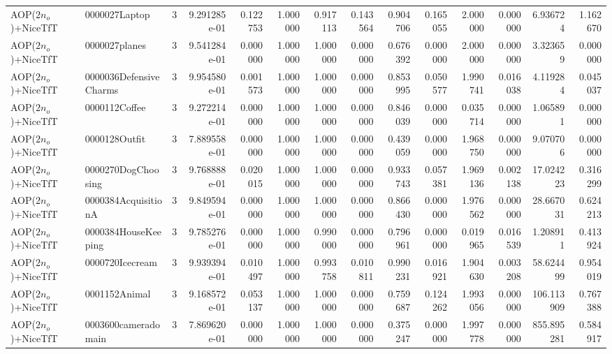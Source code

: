 \begin{tabular}{llrr|r|rr|rr|rr|rrr}
     AOP($2 n_o$)+NiceTfT &          0000027Laptop &       3 & 9.291285e-01 & 0.122753 & 1.000000 &      0.917113 & 0.143564 &      0.904706 & 0.165055 &      2.000000 &    0.000000 &     6.936724 &    1.162670 \\
     AOP($2 n_o$)+NiceTfT &          0000027planes &       3 & 9.541284e-01 & 0.000000 & 1.000000 &      1.000000 & 0.000000 &      0.676392 & 0.000000 &      2.000000 &    0.000000 &     3.323659 &    0.000000 \\
     AOP($2 n_o$)+NiceTfT & 0000036DefensiveCharms &       3 & 9.954580e-01 & 0.001573 & 1.000000 &      1.000000 & 0.000000 &      0.853995 & 0.050577 &      1.990741 &    0.016038 &     4.119284 &    0.045037 \\
     AOP($2 n_o$)+NiceTfT &          0000112Coffee &       3 & 9.272214e-01 & 0.000000 & 1.000000 &      1.000000 & 0.000000 &      0.846039 & 0.000000 &      0.035714 &    0.000000 &     1.065891 &    0.000000 \\
     AOP($2 n_o$)+NiceTfT &          0000128Outfit &       3 & 7.889558e-01 & 0.000000 & 1.000000 &      1.000000 & 0.000000 &      0.439059 & 0.000000 &      1.968750 &    0.000000 &     9.070706 &    0.000000 \\
     AOP($2 n_o$)+NiceTfT &     0000270DogChoosing &       3 & 9.768888e-01 & 0.020015 & 1.000000 &      1.000000 & 0.000000 &      0.933743 & 0.057381 &      1.969136 &    0.002138 &    17.024223 &    0.316299 \\
     AOP($2 n_o$)+NiceTfT &    0000384AcquisitionA &       3 & 9.849594e-01 & 0.000000 & 1.000000 &      1.000000 & 0.000000 &      0.866430 & 0.000000 &      1.976562 &    0.000000 &    28.667031 &    0.624213 \\
     AOP($2 n_o$)+NiceTfT &    0000384HouseKeeping &       3 & 9.785276e-01 & 0.000000 & 1.000000 &      0.990000 & 0.000000 &      0.796961 & 0.000000 &      0.019965 &    0.016539 &     1.208911 &    0.413924 \\
     AOP($2 n_o$)+NiceTfT &        0000720Icecream &       3 & 9.939394e-01 & 0.010497 & 1.000000 &      0.993758 & 0.010811 &      0.990231 & 0.016921 &      1.904630 &    0.003208 &    58.624499 &    0.954019 \\
     AOP($2 n_o$)+NiceTfT &          0001152Animal &       3 & 9.168572e-01 & 0.053137 & 1.000000 &      1.000000 & 0.000000 &      0.759687 & 0.124262 &      1.993056 &    0.000000 &   106.113909 &    0.767388 \\
     AOP($2 n_o$)+NiceTfT &    0003600cameradomain &       3 & 7.869620e-01 & 0.000000 & 1.000000 &      1.000000 & 0.000000 &      0.375247 & 0.000000 &      1.997778 &    0.000000 &   855.895281 &    0.584917 \\

\end{tabular}
